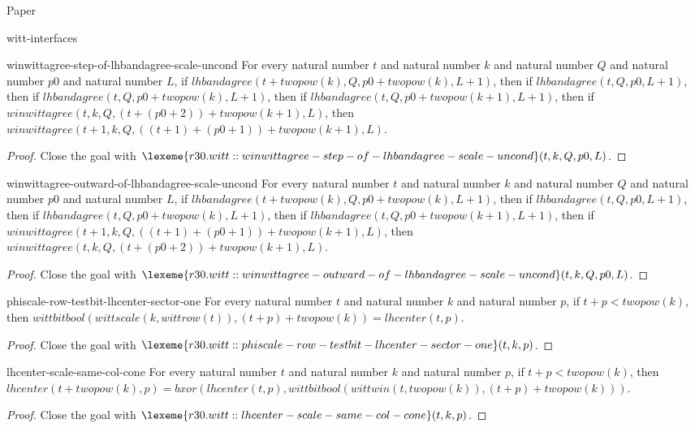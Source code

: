 \begin{lexlean}{Paper}
\begin{section}{witt-interfaces}
  \begin{theorem}{winwittagree-step-of-lhbandagree-scale-uncond}
  For every natural number \(t\) and natural number \(k\) and natural number \(Q\) and natural number \(p0\) and natural number \(L\), if \(lhbandagree(t + twopow(k), Q, p0 + twopow(k), L + 1)\), then if \(lhbandagree(t, Q, p0, L + 1)\), then if \(lhbandagree(t, Q, p0 + twopow(k), L + 1)\), then if \(lhbandagree(t, Q, p0 + twopow(k + 1), L + 1)\), then if \(winwittagree(t, k, Q, (t + (p0 + 2)) + twopow(k + 1), L)\), then \(winwittagree(t + 1, k, Q, ((t + 1) + (p0 + 1)) + twopow(k + 1), L)\).
  \begin{proof}
  Close the goal with \(\lexeme{r30.witt::winwittagree-step-of-lhbandagree-scale-uncond}(t, k, Q, p0, L)\).
  \end{proof}
  \end{theorem}

  \begin{theorem}{winwittagree-outward-of-lhbandagree-scale-uncond}
  For every natural number \(t\) and natural number \(k\) and natural number \(Q\) and natural number \(p0\) and natural number \(L\), if \(lhbandagree(t + twopow(k), Q, p0 + twopow(k), L + 1)\), then if \(lhbandagree(t, Q, p0, L + 1)\), then if \(lhbandagree(t, Q, p0 + twopow(k), L + 1)\), then if \(lhbandagree(t, Q, p0 + twopow(k + 1), L + 1)\), then if \(winwittagree(t + 1, k, Q, ((t + 1) + (p0 + 1)) + twopow(k + 1), L)\), then \(winwittagree(t, k, Q, (t + (p0 + 2)) + twopow(k + 1), L)\).
  \begin{proof}
  Close the goal with \(\lexeme{r30.witt::winwittagree-outward-of-lhbandagree-scale-uncond}(t, k, Q, p0, L)\).
  \end{proof}
  \end{theorem}

  \begin{theorem}{phiscale-row-testbit-lhcenter-sector-one}
  For every natural number \(t\) and natural number \(k\) and natural number \(p\), if \(t + p < twopow(k)\), then \(wittbitbool(wittscale(k, wittrow(t)), (t + p) + twopow(k)) = lhcenter(t, p)\).
  \begin{proof}
  Close the goal with \(\lexeme{r30.witt::phiscale-row-testbit-lhcenter-sector-one}(t, k, p)\).
  \end{proof}
  \end{theorem}

  \begin{theorem}{lhcenter-scale-same-col-cone}
  For every natural number \(t\) and natural number \(k\) and natural number \(p\), if \(t + p < twopow(k)\), then \(lhcenter(t + twopow(k), p) = bxor(lhcenter(t, p), wittbitbool(wittwin(t, twopow(k)), (t + p) + twopow(k)))\).
  \begin{proof}
  Close the goal with \(\lexeme{r30.witt::lhcenter-scale-same-col-cone}(t, k, p)\).
  \end{proof}
  \end{theorem}


\end{section}
\end{lexlean}
